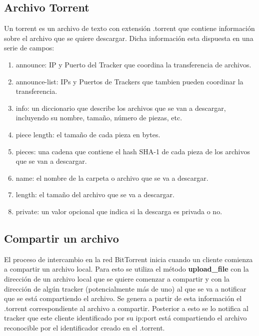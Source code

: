 \documentclass[article]{llncs}
\begin{document}
\subsection{Archivo Torrent}
Un torrent es un archivo de texto con extensi\'on .torrent que contiene informaci\'on sobre el archivo 
que se quiere descargar. Dicha informaci\'on esta dispuesta en una serie de campos:

\begin{enumerate}
  \item announce: IP y Puerto del Tracker que coordina la transferencia de archivos.
  \item announce-list: IPs y Puertos de Trackers que tambien pueden coordinar la transferencia.
  \item info: un diccionario que describe los archivos que se van a descargar, incluyendo su nombre, tamaño, número de piezas, etc.
  \item piece length: el tamaño de cada pieza en bytes.
  \item pieces: una cadena que contiene el hash SHA-1 de cada pieza de los archivos que se van a descargar.
  \item name: el nombre de la carpeta o archivo que se va a descargar.
  \item length: el tamaño del archivo que se va a descargar.
  \item private: un valor opcional que indica si la descarga es privada o no.
\end{enumerate}

\subsection{Compartir un archivo}
El proceso de intercambio en la red BitTorrent inicia cuando un cliente comienza a compartir un archivo local. Para esto se
utiliza el método \textbf{upload_file} con la dirección de un archivo local que se quiere comenzar a compartir y con la dirección 
de algún tracker (potencialmente más de uno) al que se va a notificar que se está compartiendo el archivo. Se genera a partir de esta información el .torrent 
correspondiente al archivo a compartir. Posterior a esto se lo notifica al tracker que este cliente identificado por su ip:port 
está compartiendo el archivo reconocible por el identificador creado en el .torrent.
\end{document}
